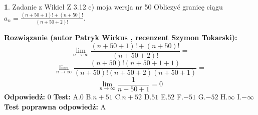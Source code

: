 \documentclass[12pt, a4paper]{article}
\theoremstyle{definition} %
\newtheorem{zad}{}
\newcommand{\zadStart}[1]{\begin{zad}#1\newline}
\newcommand{\zadStop}{\end{zad}}
\newcommand{\rozwStart}[2]{\noindent \textbf{Rozwiązanie (autor #1 , recenzent #2): }\newline}
\newcommand{\rozwStop}{\newline}
\newcommand{\odpStart}{\noindent \textbf{Odpowiedź:}\newline}
\newcommand{\odpStop}{\newline}
\newcommand{\testStart}{\noindent \textbf{Test:}\newline}
\newcommand{\testStop}{\newline}
\newcommand{\kluczStart}{\noindent \textbf{Test poprawna odpowiedź:}\newline}
\newcommand{\kluczStop}{\newline}
\begin{document}
\zadStart{Zadanie z Wikieł Z 3.12 c) moja wersja nr 50}
Obliczyć granicę ciągu $a_{n}=\frac{(n+50+1)!+(n+50)!}{(n+50+2)!}$.
\zadStop
\rozwStart{Patryk Wirkus}{Szymon Tokarski}
$$\lim\limits_{n\to\infty}\frac{(n+50+1)!+(n+50)!}{(n+50+2)!}=$$
$$\lim\limits_{n\to\infty}\frac{(n+50)!(n+50+1+1)}{(n+50)!(n+50+2)(n+50+1)}=$$
$$\lim\limits_{n\to\infty}\frac{1}{n+50+1}= 0$$
\rozwStop
\odpStart
$0$
\odpStop
\testStart
A.$0$
B.$n+51$
C.$n+52$
D.$51$
E.$52$
F.$-51$
G.$-52$
H.$\infty$
I.$-\infty$
\testStop
\kluczStart
A
\kluczStop
\end{document}
